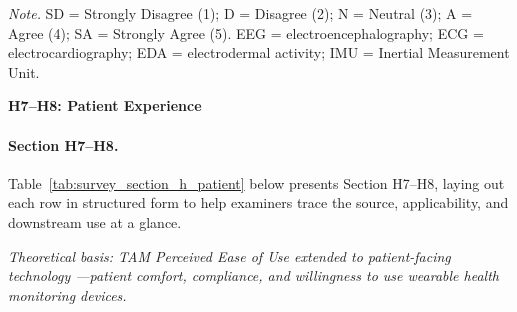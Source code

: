 \vspace{0.5em}\noindent\textit{Note.} SD = Strongly Disagree (1); D = Disagree (2); N = Neutral (3); A = Agree (4); SA = Strongly Agree (5). EEG = electroencephalography; ECG = electrocardiography; EDA = electrodermal activity; IMU = Inertial Measurement Unit.

\noindent\textbf{H7--H8: Patient Experience}
\paragraph{Section H7--H8.}
\noindent Table~\ref{tab:survey_section_h_patient} below presents Section H7--H8, laying out each row in structured form to help examiners trace the source, applicability, and downstream use at a glance. %


\noindent\textit{Theoretical basis: TAM Perceived Ease of Use extended to patient-facing technology \cite{holden2010tam}---patient comfort, compliance, and willingness to use wearable health monitoring devices.}


